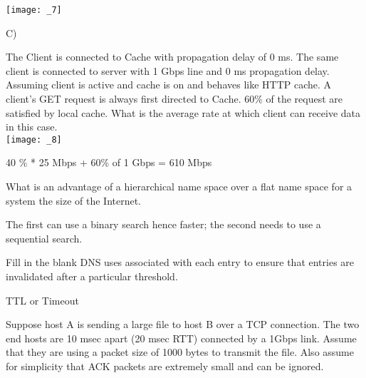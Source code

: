 \documentclass[answers,addpoints]{exam}
\begin{document}
\begin{questions}
\texttt{[image: \_7]}\\
\begin{solution}
C)
\end{solution}

\question
The Client is connected to Cache with propagation delay of 0 ms. The  same client is connected to server with 1 Gbps line and 0 ms propagation delay. Assuming client is active and cache is on and behaves like HTTP cache. A client’s GET request is always first directed to Cache. 60\% of the request are satisfied by local cache. What is the average rate at which client can receive data in this case. \\
\texttt{[image: \_8]}\\
\vspace{2in}
\begin{solution}
40 \% * 25 Mbps + 60\% of 1 Gbps = 610 Mbps

\end{solution}
\question
What is an advantage of a hierarchical name space over a flat name space for a system the size of the Internet.
\fillwithdottedlines{1in}

\begin{solution}
The first can use a binary search hence faster; the second needs to use a sequential search. 
\end{solution}

\question
Fill in the blank
DNS uses \underline{\hspace{3cm}} associated with each entry to ensure that entries are invalidated after a particular threshold.
\begin{solution}
TTL or Timeout
\end{solution}

\question
Suppose host A is sending a large file to host B over a TCP connection. The two end hosts are 10 msec apart (20 msec RTT) connected by a 1Gbps link. Assume that they are using a packet size of 1000 bytes to transmit the file. Also assume for simplicity that ACK packets are extremely small and can be ignored. 


\end{questions}
\end{document}
